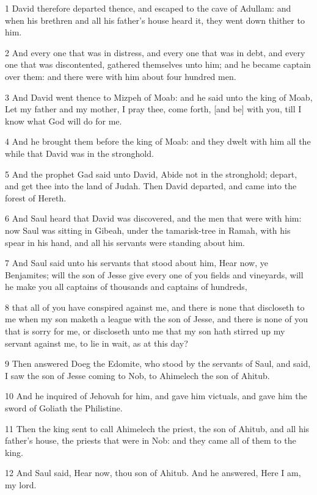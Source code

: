 \par 1 David therefore departed thence, and escaped to the cave of Adullam: and when his brethren and all his father's house heard it, they went down thither to him.
\par 2 And every one that was in distress, and every one that was in debt, and every one that was discontented, gathered themselves unto him; and he became captain over them: and there were with him about four hundred men.
\par 3 And David went thence to Mizpeh of Moab: and he said unto the king of Moab, Let my father and my mother, I pray thee, come forth, [and be] with you, till I know what God will do for me.
\par 4 And he brought them before the king of Moab: and they dwelt with him all the while that David was in the stronghold.
\par 5 And the prophet Gad said unto David, Abide not in the stronghold; depart, and get thee into the land of Judah. Then David departed, and came into the forest of Hereth.
\par 6 And Saul heard that David was discovered, and the men that were with him: now Saul was sitting in Gibeah, under the tamarisk-tree in Ramah, with his spear in his hand, and all his servants were standing about him.
\par 7 And Saul said unto his servants that stood about him, Hear now, ye Benjamites; will the son of Jesse give every one of you fields and vineyards, will he make you all captains of thousands and captains of hundreds,
\par 8 that all of you have conspired against me, and there is none that discloseth to me when my son maketh a league with the son of Jesse, and there is none of you that is sorry for me, or discloseth unto me that my son hath stirred up my servant against me, to lie in wait, as at this day?
\par 9 Then answered Doeg the Edomite, who stood by the servants of Saul, and said, I saw the son of Jesse coming to Nob, to Ahimelech the son of Ahitub.
\par 10 And he inquired of Jehovah for him, and gave him victuals, and gave him the sword of Goliath the Philistine.
\par 11 Then the king sent to call Ahimelech the priest, the son of Ahitub, and all his father's house, the priests that were in Nob: and they came all of them to the king.
\par 12 And Saul said, Hear now, thou son of Ahitub. And he answered, Here I am, my lord.
